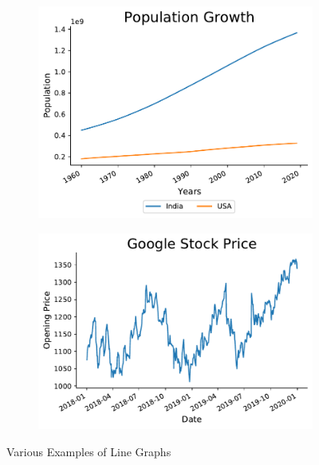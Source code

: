 \documentclass[twoside,12pt]{report}  %
\begin{document}
\begin{figure}[H]
	\begin{subfigure}[b]{0.3\textwidth}
		\includegraphics[width=\textwidth]{./images/linegraph_multivariate_example.pdf}
		\label{line_graph_multivariate}
	\end{subfigure}
	\begin{subfigure}[b]{0.3\textwidth}
		\includegraphics[width=\textwidth]{./images/run_sequence_example.pdf}
		\label{runsequence_example}
	\end{subfigure}
	\caption{Various Examples of Line Graphs}
	\label{line_graph_examples}
\end{figure}

\vfill
\end{document}
